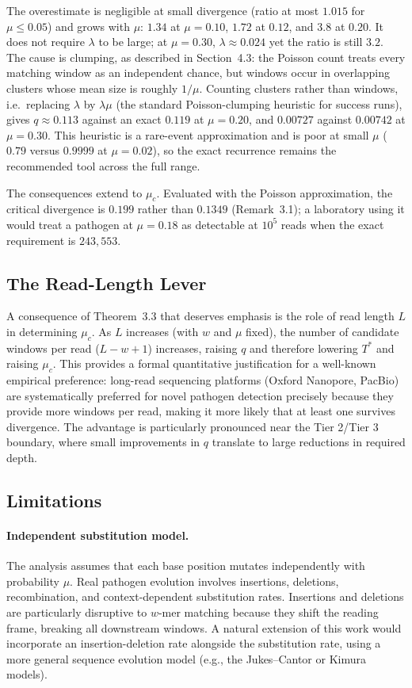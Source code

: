 \documentclass[12pt]{article}
\theoremstyle{definition}
\theoremstyle{plain}
\begin{document}
The overestimate is negligible at small divergence (ratio at most $1.015$
for $\mu\le0.05$) and grows with $\mu$: $1.34$ at $\mu=0.10$, $1.72$ at $0.12$,
and $3.8$ at $0.20$. It does not require $\lambda$ to be large; at
$\mu=0.30$, $\lambda\approx0.024$ yet the ratio is still $3.2$. The cause is
clumping, as described in Section~4.3: the Poisson count treats every
matching window as an independent chance, but windows occur in overlapping
clusters whose mean size is roughly $1/\mu$. Counting clusters rather than
windows, i.e.\ replacing $\lambda$ by $\lambda\mu$ (the standard
Poisson-clumping heuristic for success runs), gives $q\approx0.113$ against
an exact $0.119$ at $\mu=0.20$, and $0.00727$ against $0.00742$ at
$\mu=0.30$. This heuristic is a rare-event approximation and is poor at
small $\mu$ ($0.79$ versus $0.9999$ at $\mu=0.02$), so the exact recurrence
remains the recommended tool across the full range.

The consequences extend to $\mu_c$. Evaluated with the Poisson
approximation, the critical divergence is $0.199$ rather than $0.1349$
(Remark~3.1); a laboratory using it would treat a pathogen at $\mu=0.18$ as
detectable at $10^5$ reads when the exact requirement is $243{,}553$.

\subsection{The Read-Length Lever}

A consequence of Theorem~3.3 that deserves emphasis is the role of read
length $L$ in determining $\mu_c$. As $L$ increases (with $w$ and $\mu$
fixed), the number of candidate windows per read ($L-w+1$) increases, raising
$q$ and therefore lowering $T^{*}$ and raising $\mu_c$. This provides a
formal quantitative justification for a well-known empirical preference:
long-read sequencing platforms (Oxford Nanopore, PacBio) are systematically
preferred for novel pathogen detection precisely because they provide more
windows per read, making it more likely that at least one survives
divergence. The advantage is particularly pronounced near the Tier 2/Tier 3
boundary, where small improvements in $q$ translate to large reductions in
required depth.

\subsection{Limitations}

\paragraph{Independent substitution model.} The analysis assumes that each
base position mutates independently with probability $\mu$. Real pathogen
evolution involves insertions, deletions, recombination, and
context-dependent substitution rates. Insertions and deletions are
particularly disruptive to $w$-mer matching because they shift the reading
frame, breaking all downstream windows. A natural extension of this work
would incorporate an insertion-deletion rate alongside the substitution
rate, using a more general sequence evolution model (e.g., the Jukes--Cantor
or Kimura models).
\end{document}
